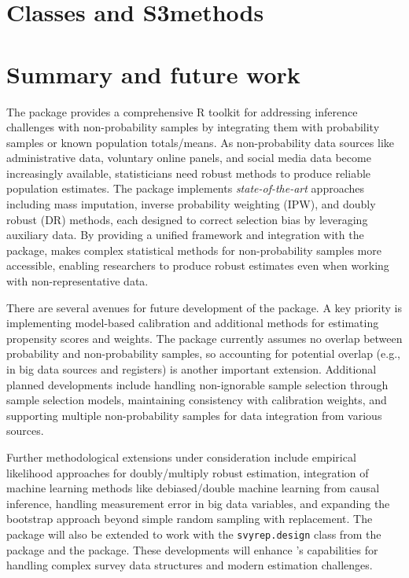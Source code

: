 \documentclass[
]{jss}
\begin{document}
\section{Classes and S3methods}\label{sec-s3methods}

\section{Summary and future work}\label{summary-and-future-work}

The  package provides a comprehensive R toolkit for
addressing inference challenges with non-probability samples by
integrating them with probability samples or known population
totals/means. As non-probability data sources like administrative data,
voluntary online panels, and social media data become increasingly
available, statisticians need robust methods to produce reliable
population estimates. The package implements \textit{state-of-the-art}
approaches including mass imputation, inverse probability weighting
(IPW), and doubly robust (DR) methods, each designed to correct
selection bias by leveraging auxiliary data. By providing a unified
framework and integration with the  package,
 makes complex statistical methods for non-probability
samples more accessible, enabling researchers to produce robust
estimates even when working with non-representative data.

There are several avenues for future development of the 
package. A key priority is implementing model-based calibration and
additional methods for estimating propensity scores and weights. The
package currently assumes no overlap between probability and
non-probability samples, so accounting for potential overlap (e.g., in
big data sources and registers) is another important extension.
Additional planned developments include handling non-ignorable sample
selection through sample selection models, maintaining consistency with
calibration weights, and supporting multiple non-probability samples for
data integration from various sources.

Further methodological extensions under consideration include empirical
likelihood approaches for doubly/multiply robust estimation, integration
of machine learning methods like debiased/double machine learning from
causal inference, handling measurement error in big data variables, and
expanding the bootstrap approach beyond simple random sampling with
replacement. The package will also be extended to work with the
\texttt{svyrep.design} class from the  package and the
 package. These developments will enhance 's
capabilities for handling complex survey data structures and modern
estimation challenges.
\end{document}
